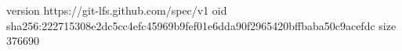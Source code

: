 version https://git-lfs.github.com/spec/v1
oid sha256:222715308e2dc5cc4efc45969b9fef01e6dda90f2965420bffbaba50c9acefdc
size 376690
